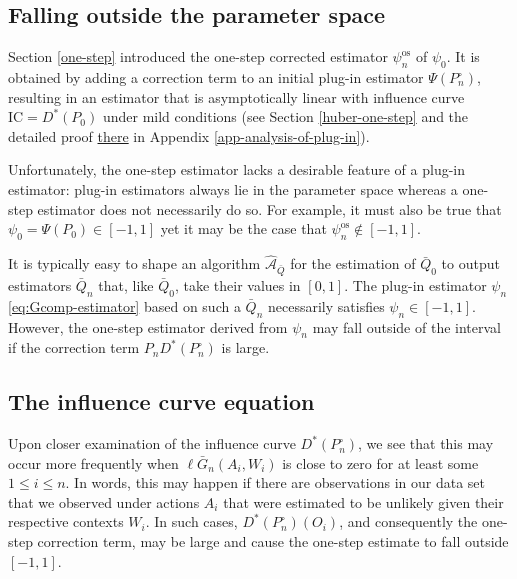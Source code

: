\documentclass[11pt,openright,twoside]{book}
\newcommand{\Algo}{\widehat{\mathcal{A}}}
\newcommand{\IC}{\textrm{IC}}
\newcommand{\Gbar}{\bar{G}}
\newcommand{\psinos}{\psi_{n}^{\textrm{os}}}
\newcommand{\Phat}{P^{\circ}}
\newcommand{\Qbar}{\bar{Q}}
\theoremstyle{definition}
\theoremstyle{definition}
\theoremstyle{definition}
\theoremstyle{remark}
\begin{document}
\hypertarget{falling-outside-the-parameter-space}{%
\subsection{Falling outside the parameter space}\label{falling-outside-the-parameter-space}}

Section \ref{one-step} introduced the one-step corrected estimator \(\psinos\)
of \(\psi_0\). It is obtained by adding a correction term to an initial plug-in
estimator \(\Psi(\Phat_{n})\), resulting in an estimator that is asymptotically
linear with influence curve \(\IC = D^{*}(P_{0})\) under mild conditions (see
Section \ref{huber-one-step} and the detailed
proof \protect\hyperlink{app-analysis-of-plug-in}{there} in Appendix
\ref{app-analysis-of-plug-in}).

Unfortunately, the one-step estimator lacks a desirable feature of a plug-in
estimator: plug-in estimators always lie in the parameter space whereas a
one-step estimator does not necessarily do so. For example, it must also be
true that \(\psi_0 = \Psi(P_{0}) \in [-1,1]\) yet it may be the case that
\(\psinos \not\in[-1,1]\).

It is typically easy to shape an algorithm \(\Algo_{\Qbar}\) for the estimation
of \(\Qbar_0\) to output estimators \(\Qbar_n\) that, like \(\Qbar_{0}\), take their
values in \([0,1]\). The plug-in estimator \(\psi_{n}\) \eqref{eq:Gcomp-estimator}
based on such a \(\Qbar_{n}\) necessarily satisfies \(\psi_{n} \in [-1,1]\).
However, the one-step estimator derived from \(\psi_{n}\) may fall outside of
the interval if the correction term \(P_{n} D^{*} (\Phat_{n})\) is large.

\hypertarget{eic-equation}{%
\subsection{The influence curve equation}\label{eic-equation}}

Upon closer examination of the influence curve \(D^*(\Phat_{n})\), we see that
this may occur more frequently when \(\ell \Gbar_n(A_i,W_i)\) is close to zero
for at least some \(1 \leq i\leq n\). In words, this may happen if there are
observations in our data set that we observed under actions \(A_i\) that were
estimated to be unlikely given their respective contexts \(W_i\). In such
cases, \(D^*(\Phat_n)(O_i)\), and consequently the one-step correction term, may
be large and cause the one-step estimate to fall outside \([-1,1]\).
\end{document}
